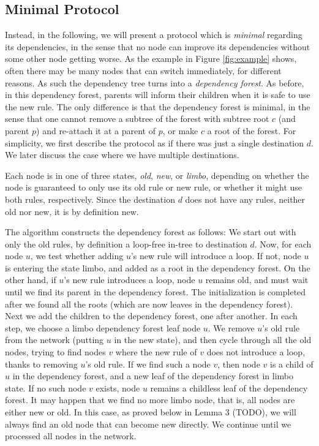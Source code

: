 \subsection{Minimal Protocol}
\label{sec:minimal}

Instead, in the following, we will present a protocol which is \emph{minimal} regarding its dependencies, in the sense that no node can improve its dependencies without some other node getting worse. As the example in Figure \ref{fig:example} shows, often there may be many nodes that can switch immediately, for different reasons. As such the dependency tree turns into a \emph{dependency forest}. As before, in this dependency forest, parents will inform their children when it is safe to use the new rule. The only difference is that the dependency forest is minimal, in the sense that one cannot remove a subtree of the forest with subtree root $c$ (and parent $p$) and re-attach it at a parent of $p$, or make $c$ a root of the forest. For simplicity, we first describe the protocol as if there was just a single destination $d$. We later discuss the case where we have multiple destinations.

Each node is in one of three states, \emph{old}, \emph{new}, or \emph{limbo}, depending on whether the node is guaranteed to only use its old rule or new rule, or whether it might use both rules, respectively. Since the destination $d$ does not have any rules, neither old nor new, it is by definition new.

The algorithm constructs the dependency forest as follows: We start out with only the old rules, by definition a loop-free in-tree to destination $d$. Now, for each node $u$, we test whether adding $u$'s new rule will introduce a loop. If not, node $u$ is entering the state limbo, and added as a root in the dependency forest. On the other hand, if $u$'s new rule introduces a loop, node $u$ remains old, and must wait until we find its parent in the dependency forest. The initialization is completed after we found all the roots (which are now leaves in the dependency forest). Next we add the children to the dependency forest, one after another. In each step, we choose a limbo dependency forest leaf node $u$. We remove $u$'s old rule from the network (putting $u$ in the new state), and then cycle through all the old nodes, trying to find nodes $v$ where the new rule of $v$ does not introduce a loop, thanks to removing $u$'s old rule. If we find such a node $v$, then node $v$ is a child of $u$ in the dependency forest, and a new leaf of the dependency forest in limbo state. If no such node $v$ exists, node $u$ remains a childless leaf of the dependency forest. It may happen that we find no more limbo node, that is, all nodes are either new or old. In this case, as proved below in Lemma 3 (TODO), we will always find an old node that can become new directly. 
We continue until we processed all nodes in the network.

